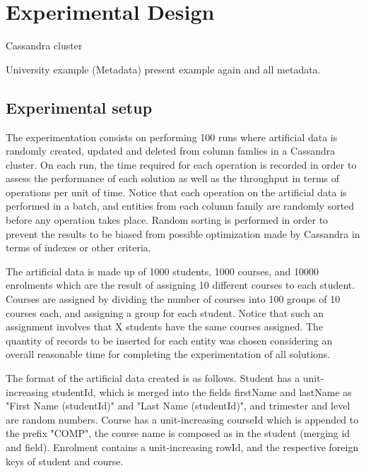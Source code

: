 \chapter{Experimental Design}
Cassandra cluster

University example (Metadata) present example again and all metadata.


\section{Experimental setup}\label{s:exp:setup}
The experimentation consists on performing 100 runs where artificial data is
randomly created, updated and deleted from column famlies in a Cassandra
cluster.
On each run, the time required for each operation is recorded in order to assess the
performance of each solution as well as the throughput in terms of operations
per unit of time. Notice that each operation on the artificial data  is
performed in a batch, and entities from each column family are randomly sorted
before any operation takes place. Random sorting is performed in order to
prevent the results to be biased from possible optimization made by Cassandra in
terms of indexes or other criteria.
		
The artificial data is made up of 1000 students, 1000 courses, and 10000
enrolments which are the result of assigning 10 different courses to each
student. Courses are assigned by dividing the number of courses
into 100 groups of 10 courses each, and assigning a group for each student.
Notice that such an assignment involves that X students have the same courses
assigned. The quantity of records to be inserted for each entity was chosen
considering an overall reasonable time for completing the experimentation of all
solutions.
		
The format of the artificial data created is as follows. Student has a
unit-increasing studentId, which is merged into the fields firstName and
lastName as "First Name (studentId)" and "Last Name (studentId)", and trimester
and level are random numbers. Course has a   unit-increasing courseId which is
appended to the prefix "COMP", the course name is composed as in the student
(merging id and field). Enrolment contains a unit-increasing rowId, and the
respective foreign keys of student and course.
		
